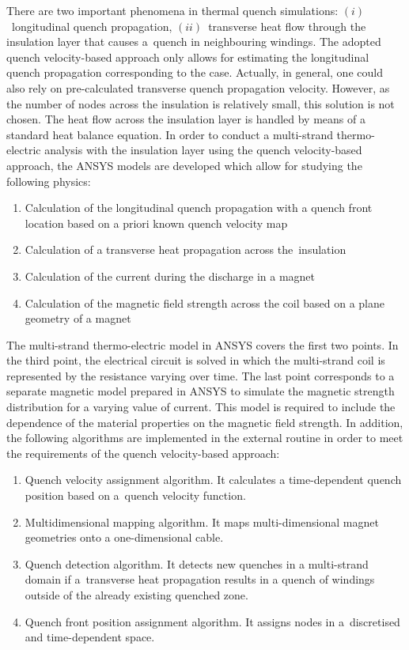 
There are two important phenomena in thermal quench simulations: $(i)$~longitudinal quench propagation, $(ii)$~transverse heat flow through the insulation layer that causes a~quench in neighbouring windings. The adopted quench velocity-based approach only allows for estimating the longitudinal quench propagation corresponding to the  case. Actually, in general, one could also rely on pre-calculated transverse quench propagation velocity. However, as the number of nodes across the insulation is relatively small, this solution is not chosen. The heat flow across the insulation layer is handled by means of a standard heat balance equation. In order to conduct a multi-strand thermo-electric analysis with the insulation layer using the quench velocity-based approach, the ANSYS models are developed which allow for studying the following physics: 

\begin{enumerate}
    \item Calculation of the longitudinal quench propagation with a quench front location based on a priori known quench velocity map
    \item Calculation of a transverse heat propagation across the~insulation
    \item Calculation of the current during the discharge in a magnet
    \item Calculation of the magnetic field strength across the coil based on a plane geometry of a magnet
\end{enumerate}

The multi-strand thermo-electric model in ANSYS covers the first two points. In the third point, the electrical circuit is solved in which the multi-strand coil is represented by the resistance varying over time. The last point corresponds to a separate magnetic model prepared in ANSYS to simulate the magnetic strength distribution for a varying value of current. This model is required to include the dependence of the material properties on the magnetic field strength. In addition, the following algorithms are implemented in the external routine in order to meet the requirements of the quench velocity-based approach:

\begin{enumerate}
    \item Quench velocity assignment algorithm. It calculates a time-dependent quench position based on a~quench velocity function.
    \item Multidimensional mapping algorithm. It maps multi-dimensional magnet geometries onto a one-dimensional cable.
    \item Quench detection algorithm. It detects new quenches in a multi-strand domain if a~transverse heat propagation results in a quench of windings outside of the already existing quenched zone.
    \item Quench front position assignment algorithm. It assigns nodes in a~discretised and time-dependent space.
\end{enumerate}

